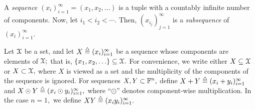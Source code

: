 \begin{defin}  \label{defin:nine5} {\rm
%
%
\label{sequencesym}%
%
A {\it sequence} $(x_i)^{\infty}_{i=1} = (x_1,x_2,\ldots)$ is a tuple with a
countably infinite number of components. Now, let $i_1 < i_2 < \cdots.$ Then, $(x_{i_j} )^{\infty}_{j=1}$ is a {\it subsequence} of
$(x_i)^{\infty}_{i=1}.$
%
}\end{defin}


Let ${\mathcal X}$ be a set, and let $X\isdef(x_i)_{i=1}^\infty$ be a sequence whose components are elements of ${\mathcal X};$ that is, $\{x_1,x_2,\ldots\}\subseteq{\mathcal X}.$
%
For convenience, we write either $X\subseteq {\mathcal X}$ or $X\subset {\mathcal X},$  where $X$ is viewed as a set and the multiplicity of the components of the sequence is ignored.
%
For sequences $X,Y\subset{\mathbb F}^n,$ define $X + Y\isdef (x_i + y_i)_{i=1}^\infty$ and $X\odot Y\isdef (x_i\odot y_i)_{i=1}^\infty,$ where ``$\odot$'' denotes component-wise multiplication.  In the case $n=1,$ we define $XY\isdef (x_i y_i)_{i=1}^\infty.$

